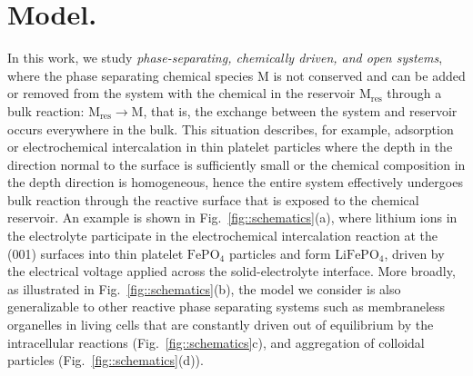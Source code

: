 \documentclass[reprint,aps,pre,superscriptaddress]{revtex4-2}
\begin{document}
\section{Model.} \label{sec::model}
In this work, we study \emph{phase-separating, chemically driven, and open systems}, where the phase separating chemical species M is not conserved and can be added or removed from the system with the chemical in the reservoir $\text{M}_\text{res}$ through a bulk reaction: $\text{M}_\text{res}\to \text{M}$, that is, the exchange between the system and reservoir occurs everywhere in the bulk\cite{Bazant2013}. This situation describes, for example, adsorption or electrochemical intercalation in thin platelet particles \cite{Singh2008,Bai2011,Cogswell2012,Bazant2017} where the depth in the direction normal to the surface is sufficiently small or the chemical composition in the depth direction is homogeneous, hence the entire system effectively undergoes bulk reaction through the reactive surface that is exposed to the chemical reservoir.
An example is shown in Fig.~\ref{fig::schematics}(a), where lithium ions in the electrolyte participate in the electrochemical intercalation reaction at the (001) surfaces into thin platelet $\text{FePO}_4$ particles and form $\text{LiFePO}_4$, driven by the electrical voltage applied across the solid-electrolyte interface. More broadly, as illustrated in Fig.~\ref{fig::schematics}(b), the model we consider is also generalizable to other reactive phase separating systems such as membraneless organelles in living cells that are constantly driven out of equilibrium by the intracellular reactions (Fig.~\ref{fig::schematics}c), and aggregation of colloidal particles (Fig.~\ref{fig::schematics}(d)).
\end{document}
